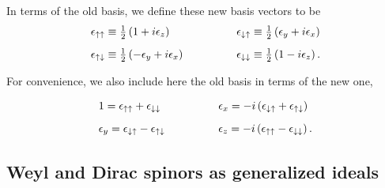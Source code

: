 \documentclass[letterpaper,12pt,titlepage,oneside,final]{book}
\begin{document}
\noindent In terms of the old basis, we define these new basis vectors to be
\begin{equation}
\begin{array}{lll} 
\epsilon_{\uparrow \uparrow} \equiv \frac{1}{2}\left(1+i{\epsilon_z}\right) & \hspace{1cm} & \epsilon_{\downarrow \uparrow} \equiv \frac{1}{2}\left({\epsilon_y}+i{\epsilon_x}\right) \vspace{3mm} \\

\epsilon_{\uparrow \downarrow} \equiv \frac{1}{2}\left(-{\epsilon_y}+i{\epsilon_x}\right)  & \hspace{1cm} & \epsilon_{\downarrow \downarrow} \equiv \frac{1}{2}\left(1-i{\epsilon_z}\right).

\end{array}
\end{equation}

\noindent For convenience, we also include here the old basis in terms of the new one,

\begin{equation}
\begin{array}{lll} 
1 = \epsilon_{\uparrow \uparrow}+\epsilon_{\downarrow \downarrow} & \hspace{1cm} & \epsilon_x = -i\left(\epsilon_{\downarrow\uparrow}+\epsilon_{\uparrow\downarrow}\right) \vspace{3mm} \\

\epsilon_y = \epsilon_{\downarrow\uparrow}-\epsilon_{\uparrow\downarrow}  & \hspace{1cm} & \epsilon_z = -i\left(\epsilon_{\uparrow \uparrow}-\epsilon_{\downarrow \downarrow}   \right).

\end{array}
\end{equation}



\subsection{Weyl and Dirac spinors as generalized ideals\label{WD}  }
\end{document}
